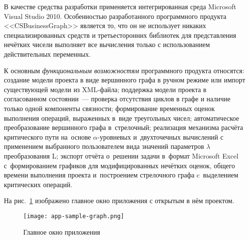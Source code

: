 В качестве средства разработки применяется интегрированная среда Microsoft Visual Studio 2010. Особенностью разработанного программного продукта <<CSBusinessGraph>> является то, что он не использует никаких специализированных средств и третьесторонних библиотек для представления нечётких чисели выполняет все вычисления только с использованием действительных переменных.

К основным \textit{функциональным возможностям} программного продукта относятся: создание модели проекта в виде вершинного графа в ручном режиме или импорт существующей модели из XML-файла; поддержка модели проекта в согласованном состоянии~--- проверка отсутствия циклов в графе и наличие только одной компоненты связности; формирование временных оценок выполнения операций, выраженных в~виде треугольных чисел; автоматическое преобразование вершинного графа в~стрелочный; реализация механизма расчёта критического пути на~основе $\alpha$-уровневых и~двухточечных вычислений с применением выбранного пользователем  вида значений параметров $\lambda$ преобразования L; экспорт отчёта о~решении задачи в~формат Microsoft Excel с~формированием графиков для модифицированных нечётких оценок, общего времени выполнения проекта и~построением стрелочного графа c~выделением критических операций.

На рис.~\ref{fig:app-sample-graph} изображено главное окно приложения с открытым в нём проектом.
\begin{figure}[h] 
  \center
  \texttt{[image: app-sample-graph.png]}
  \caption{Главное окно приложения} 
  \label{fig:app-sample-graph}
\end{figure}
